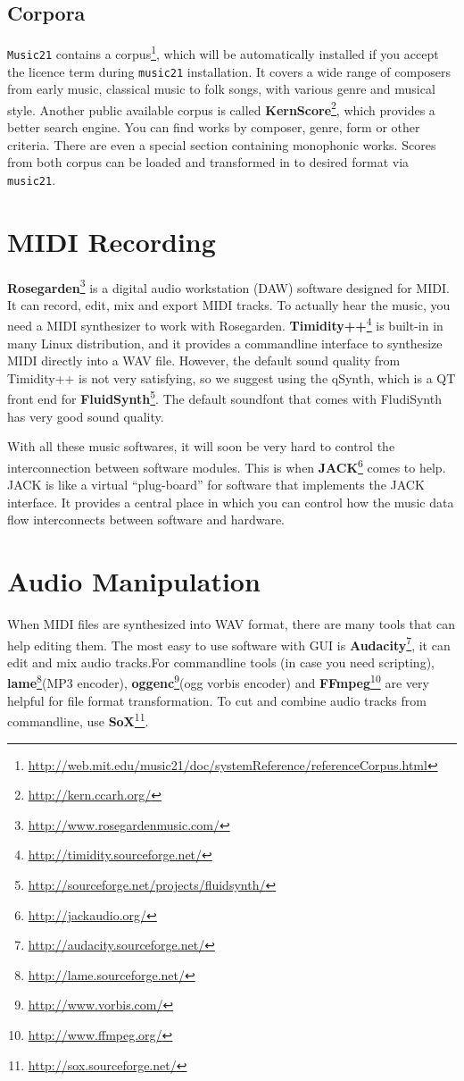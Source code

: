 \subsection*{Corpora}
\texttt{Music21} contains a corpus\footnote{\url{http://web.mit.edu/music21/doc/systemReference/referenceCorpus.html}}, which will be automatically installed if you accept the licence term during \texttt{music21} installation. It covers a wide range of composers from early music, classical music to folk songs, with various genre and musical style. Another public available corpus is called \textbf{KernScore}\footnote{\url{http://kern.ccarh.org/}}, which provides a better search engine. You can find works by composer, genre, form or other criteria. There are even a special section containing monophonic works. Scores from both corpus can be loaded and transformed in to desired format via \texttt{music21}.

\section*{MIDI Recording}
\textbf{Rosegarden}\footnote{\url{http://www.rosegardenmusic.com/}} is a digital audio workstation (DAW) software designed for MIDI. It can record, edit, mix and export MIDI tracks. To actually hear the music, you need a MIDI synthesizer to work with Rosegarden. \textbf{Timidity++}\footnote{\url{http://timidity.sourceforge.net/}} is built-in in many Linux distribution, and it provides a commandline interface to synthesize MIDI directly into a WAV file. However, the default sound quality from Timidity++ is not very satisfying, so we suggest using the qSynth, which is a QT front end for \textbf{FluidSynth}\footnote{\url{http://sourceforge.net/projects/fluidsynth/}}. The default soundfont that comes with FludiSynth has very good sound quality.

With all these music softwares, it will soon be very hard to control the interconnection between software modules. This is when \textbf{JACK}\footnote{\url{http://jackaudio.org/}} comes to help. JACK is like a virtual \enquote{plug-board} for software that implements the JACK interface. It provides a central place in which you can control how the music data flow interconnects between software and hardware.

\section*{Audio Manipulation}

When MIDI files are synthesized into WAV format, there are many tools that can help editing them. The most easy to use software with GUI is \textbf{Audacity}\footnote{\url{http://audacity.sourceforge.net/}}, it can edit and mix audio tracks.For commandline tools (in case you need scripting), \textbf{lame}\footnote{\url{http://lame.sourceforge.net/}}(MP3 encoder), \textbf{oggenc}\footnote{\url{http://www.vorbis.com/}}(ogg vorbis encoder) and \textbf{FFmpeg}\footnote{\url{http://www.ffmpeg.org/}} are very helpful for file format transformation. To cut and combine audio tracks from commandline, use \textbf{SoX}\footnote{\url{http://sox.sourceforge.net/}}.

